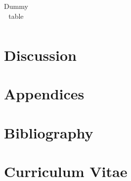 \documentclass[12pt]{article}
\begin{document}
\begin{table}[H]
	\caption{Dummy table}
	\begin{center}
		\begin{tabular}{|c|c|}
			
		\end{tabular}
	\end{center}
	\label{tab:dum2}
\end{table}

\section*{Discussion} 


\section*{Appendices} %
\newpage

\section*{Bibliography}
\renewcommand{\bibsection}{}


\newpage

\section*{Curriculum Vitae}
\end{document}
